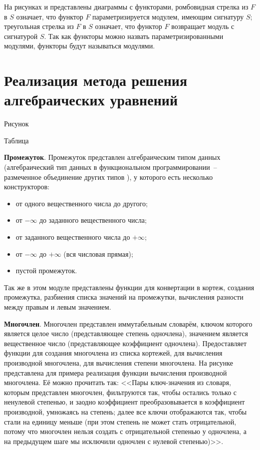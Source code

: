 На рисунках \TODO и \TODO представлены диаграммы с функторами,
ромбовидная стрелка из \(F\) в \(S\) означает, что функтор \(F\) параметризируется модулем, имеющим сигнатуру \(S\);
треугольная стрелка из \(F\) в \(S\) означает, что функтор \(F\) возвращает модуль с сигнатурой \(S\).
Так как функторы можно назвать параметризированными модулями, функторы будут называться модулями.

\section{Реализация метода решения алгебраических уравнений}

\TODO Рисунок

\TODO Таблица

\textbf{Промежуток}. Промежуток представлен алгебраическим типом данных
(алгебраический тип данных в функциональном программировании~-- размеченное объединение
других типов \cite{fprog-adt}),
у которого есть несколько конструкторов:

\begin{itemize}
    \item от одного вещественного числа до другого;
    \item от \(-\infty\) до заданного вещественного числа;
    \item от заданного вещественного числа до \(+\infty\);
    \item от \(-\infty\) до \(+\infty\) (вся числовая прямая);
    \item пустой промежуток.
\end{itemize}

Так же в этом модуле представлены функции для конвертации в кортеж, создания промежутка,
разбиения списка значений на промежутки, вычисления разности между правым и левым значением.

\textbf{Многочлен}. Многочлен представлен иммутабельным словарём, ключом которого является целое число (представляющее степень одночлена),
значением является вещественное число (представляющее коэффициент одночлена).
Предоставляет функции для создания многочлена из списка кортежей, для вычисления производной многочлена, для вычисления степени многочлена.
На рисунке \TODO представлена для примера реализация функции вычисления производной многочлена. Её можно прочитать так:
<<Пары ключ-значения из словаря, которым представлен многочлен, фильтруются так, чтобы остались только с ненулевой степенью,
и заодно коэффициент преобразовывается в коэффициент производной, умножаясь на степень; далее все ключи отображаются так, чтобы стали на единицу меньше
(при этом степень не может стать отрицательной, потому что многочлен нельзя создать с отрицательной степенью у одночлена,
а на предыдущем шаге мы исключили одночлен с нулевой степенью)>>.


